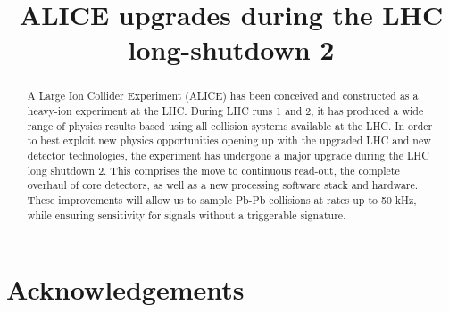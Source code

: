 \documentclass[ALICE,manyauthors]{cernphprep}
\begin{document}
\begin{titlepage}

\title{ALICE upgrades during the LHC long-shutdown 2}


\begin{abstract}
A Large Ion Collider Experiment (ALICE) has been conceived and constructed as a heavy-ion experiment at the LHC. During LHC runs 1 and 2, it has produced a wide range of physics results based using all collision systems available at the LHC.
In order to best exploit new physics opportunities opening up with the upgraded LHC and new detector technologies, the experiment has undergone a major upgrade during the LHC long shutdown 2. This comprises the move to continuous read-out, the complete overhaul of core detectors, as well as a new processing software stack and hardware. 
These improvements will allow us to sample Pb-Pb collisions at rates up to 50 kHz, while ensuring sensitivity for signals without a triggerable signature.
\end{abstract}
\end{titlepage}

\setcounter{page}{2} %

\tableofcontents
\listoffigures
\listoftables















\cleardoublepage
\newenvironment{acknowledgement}{\relax}{\relax}
\begin{acknowledgement}
\section*{Acknowledgements}
%
\end{acknowledgement}
\end{document}

